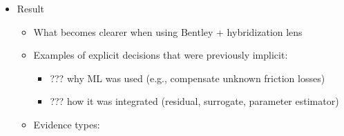 \documentclass[
]{article}
\providecommand{\tightlist}{%
  \setlength{\itemsep}{0pt}\setlength{\parskip}{0pt}}
\begin{document}
\begin{itemize}
\begin{itemize}
\begin{itemize}
\begin{itemize}
        These requirements ensure that hybridization:

        \begin{itemize}
        \tightlist
        \item
          preserves \textbf{model validity and robustness (MC14)},
        \item
          supports controlled \textbf{DT evolution (MC13)}.
        \end{itemize}
      \item
        Deliverable Requirements\\
        \emph{(Link to MC11: Tooling, MC12: Constellation, MC17:
        Operation)}\\
        The outputs of hybridization namely the inductive models must
        satisfy operational constraints:

        \begin{itemize}
        \tightlist
        \item
          \textbf{Low latency:}\\
          Predictions must be computed within time constraints
          compatible with DT services.
        \item
          \textbf{Stability:}\\
          Outputs must not disrupt existing simulation workflows.\\
          These requirements ensure seamless integration of
          hybridization into:
        \item
          the DT execution environment (MC11),
        \item
          the orchestration of services (MC12),
        \item
          real-time operation (MC17).
        \end{itemize}
      \end{itemize}
    \end{itemize}
  \end{itemize}
\item
  Result

  \begin{itemize}
  \tightlist
  \item
    What becomes clearer when using Bentley + hybridization lens
  \item
    Examples of explicit decisions that were previously implicit:

    \begin{itemize}
    \tightlist
    \item
      ??? why ML was used (e.g., compensate unknown friction losses)
    \item
      ??? how it was integrated (residual, surrogate, parameter
      estimator)
    \end{itemize}
  \item
    Evidence types:


\end{itemize}
\end{itemize}
\end{document}
